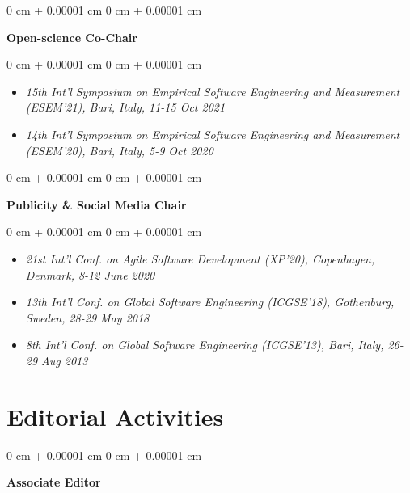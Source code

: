 \documentclass[10pt, a4paper]{article}
\newenvironment{highlights}{
    \begin{itemize}[
        topsep=0.10 cm,
        parsep=0.10 cm,
        partopsep=0pt,
        itemsep=0pt,
        leftmargin=0 cm + 10pt
    ]
}{
    \end{itemize}
} %
\newenvironment{onecolentry}{
    \begin{adjustwidth}{
        0 cm + 0.00001 cm
    }{
        0 cm + 0.00001 cm
    }
}{
    \end{adjustwidth}
} %
\begin{document}
        \vspace{0.2 cm}

        \begin{onecolentry}
            \textbf{Open-science Co-Chair}\end{onecolentry}

        \vspace{0.10 cm}
        \begin{onecolentry}
            \begin{highlights}
                \item \textit{15th Int'l Symposium on Empirical Software Engineering and Measurement (ESEM’21), Bari, Italy, 11-15 Oct 2021}
                \item \textit{14th Int'l Symposium on Empirical Software Engineering and Measurement (ESEM’20), Bari, Italy, 5-9 Oct 2020}
            \end{highlights}
        \end{onecolentry}


        \vspace{0.2 cm}

        \begin{onecolentry}
            \textbf{Publicity \& Social Media Chair}\end{onecolentry}

        \vspace{0.10 cm}
        \begin{onecolentry}
            \begin{highlights}
                \item \textit{21st Int’l Conf. on Agile Software Development (XP’20), Copenhagen, Denmark, 8-12 June 2020}
                \item \textit{13th Int’l Conf. on Global Software Engineering (ICGSE'18), Gothenburg, Sweden, 28-29 May 2018}
                \item \textit{8th Int’l Conf. on Global Software Engineering (ICGSE'13), Bari, Italy, 26-29 Aug 2013}
            \end{highlights}
        \end{onecolentry}



    
    \section{Editorial Activities}



        
        \begin{onecolentry}
            \textbf{Associate Editor}\end{onecolentry}
\end{document}

